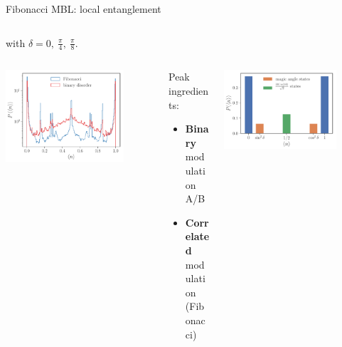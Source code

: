 \begin{frame}{Fibonacci MBL: local entanglement}
\begin{columns}
\begin{column}{0.5\textwidth}
with $\delta = 0,~\frac{\pi}{4},~\frac{\pi}{8}$.
\end{column}
\end{columns}
\begin{columns}
\begin{column}{0.33\textwidth}
\centering
\includegraphics[width=0.8\textwidth]{img/3_Fibonacci/local_observable_fibo_shuffle_p_8_h_5_L_22}
\end{column}
\begin{column}{0.33\textwidth}
Peak ingredients:
\begin{itemize}
	\item \textbf{Binary} modulation A/B
	\item \textbf{Correlated} modulation (Fibonacci)
\end{itemize}
\end{column}
\begin{column}{0.33\textwidth}
\centering
\includegraphics[width=0.8\textwidth]{img/3_Fibonacci/sz_perturbation_theory}
\end{column}
\end{columns}
\end{frame}